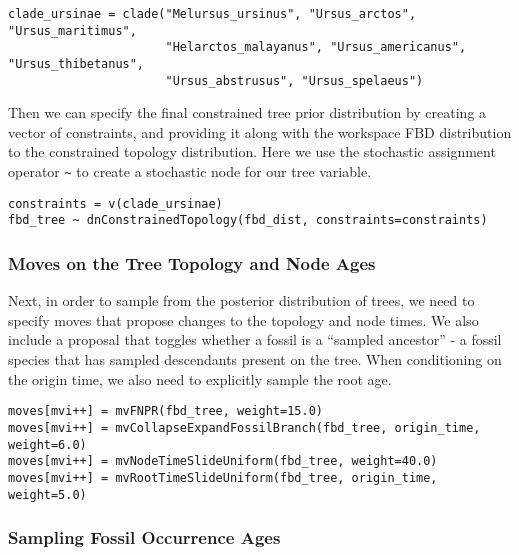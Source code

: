 {\tt \begin{snugshade*}
\begin{lstlisting}
clade_ursinae = clade("Melursus_ursinus", "Ursus_arctos", "Ursus_maritimus", 
                      "Helarctos_malayanus", "Ursus_americanus", "Ursus_thibetanus", 
                      "Ursus_abstrusus", "Ursus_spelaeus")
\end{lstlisting}
\end{snugshade*}}

Then we can specify the final constrained tree prior distribution by creating a vector of constraints, and providing it along with the workspace FBD distribution to the constrained topology distribution.
Here we use the stochastic assignment operator \verb+~+ to create a stochastic node for our tree variable. 

{\tt \begin{snugshade*}
\begin{lstlisting}
constraints = v(clade_ursinae)
fbd_tree ~ dnConstrainedTopology(fbd_dist, constraints=constraints)
\end{lstlisting}
\end{snugshade*}}

\subsubsection{Moves on the Tree Topology and Node Ages}\label{subsub:RB-FBD-TreeMoves}

Next, in order to sample from the posterior distribution of trees, we need to specify moves that propose changes to the  topology and node times.
We also include a proposal that toggles whether a fossil is a ``sampled ancestor'' - a fossil species that has sampled descendants present on the tree.
When conditioning on the origin time, we also need to explicitly sample the root age.
{\tt \begin{snugshade*}
\begin{lstlisting}
moves[mvi++] = mvFNPR(fbd_tree, weight=15.0)
moves[mvi++] = mvCollapseExpandFossilBranch(fbd_tree, origin_time, weight=6.0)
moves[mvi++] = mvNodeTimeSlideUniform(fbd_tree, weight=40.0)
moves[mvi++] = mvRootTimeSlideUniform(fbd_tree, origin_time, weight=5.0)
\end{lstlisting}
\end{snugshade*}}

\subsubsection{Sampling Fossil Occurrence Ages}\label{subsub:RB-FBD-TipSamp}

